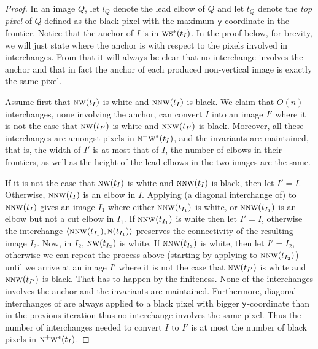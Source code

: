 \documentclass[lotsofwhite,charterfonts]{patmorin}
\newcommand{\N}{\textsc{n}}
\renewcommand{\S}{\textsc{s}}
\newcommand{\W}{\textsc{w}}
\newcommand{\NW}{\textsc{nw}}
\newcommand{\y}{\ensuremath{\protect\textup{\textsf{y}}}}
\newcommand{\ic}[2]{\langle #1,#2 \rangle}
\begin{document}
\begin{proof}

In an image $Q$, let $l_Q$ denote the lead elbow of $Q$ and let $t_Q$
denote the \emph{top pixel} of $Q$ defined as the black pixel with the
maximum \y-coordinate in the frontier. Notice that the anchor of $I$
is in $\W\S^*(t_I)$. In the proof below, for brevity, we will just
state where the anchor is with respect to the pixels involved in
interchanges. From that it will always be clear that  no interchange
involves the anchor and that in fact the anchor of each produced
non-vertical image is exactly the same pixel.

Assume first that $\NW(t_I)$ is white and $\N\NW(t_I)$ is black. We
claim that $O(n)$ interchanges, none involving the anchor, can convert
$I$ into an image $I'$ where it is not the case that $\NW(t_{I'})$ is
white and $\N\NW(t_{I'})$ is black. Moreover, all these interchanges
are amongst pixels in $\N^+\W^*(t_I)$, and the invariants are
maintained, that is, the width of $I'$ is at most that of $I$, the
number of elbows in their frontiers, as well as the height of the lead
elbows in the two images are the same. 

If it is not the case that $\NW(t_I)$ is white and $\N\NW(t_I)$ is
black, then let $I'=I$. Otherwise, $\N\NW(t_I)$ is an elbow in $I$.
Applying (a diagonal interchange of)  to
$\N\NW(t_I)$ gives an image $I_1$ where either $\N\NW(t_{I_1})$ is
white, or $\N\NW(t_{I_1})$ is an elbow but not a cut elbow in $I_1$.
If $\N\NW(t_{I_1})$ is white then let $I'=I$, otherwise the
interchange $\ic{\N\NW(t_{I_1})}{\N(t_{I_1})}$ preserves the
connectivity of the resulting image $I_2$. Now, in $I_2$,
$\NW(t_{I_2})$ is white. If $\N\NW(t_{I_2})$ is white, then let
$I'=I_2$, otherwise we can repeat the process above (starting by
applying  to $\N\NW(t_{I_2})$) until we arrive at an
image $I'$ where it is not the case that $\NW(t_{I'})$ is white and
$\N\NW(t_{I'})$ is black. That has to happen by the finiteness. None
of the interchanges involves the anchor and the invariants are
maintained. Furthermore, diagonal interchanges of 
are always applied to a black pixel with bigger \y-coordinate than in
the previous iteration thus no interchange involves the same pixel.
Thus the number of interchanges needed to convert $I$ to $I'$ is at
most the number of black pixels in $\N^+\W^*(t_I)$.



\end{proof}
\end{document}
